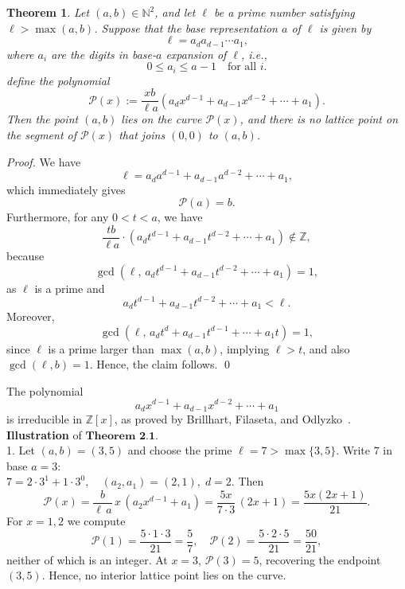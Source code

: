 \documentclass[12pt, reqno]{amsart}
\newtheorem{theorem}{Theorem}[section]
\theoremstyle{definition}
\theoremstyle{remark}
\numberwithin{equation}{section}
\begin{document}
\begin{theorem}
Let $(a,b) \in \mathbb{N}^{2}$, and let $\ell$ be a prime number satisfying $\ell > \max(a,b)$. Suppose that the base representation $a$ of $\ell$ is given by
\[
\ell = a_{d}a_{d-1}\cdots a_{1},
\]
where $a_{i}$ are the digits in base-$a$ expansion of $\ell$, i.e.,
\[
0 \leq a_{i} \leq a-1 \quad \text{for all } i.
\]
define the polynomial
\[
\mathcal{P}(x) := \frac{xb}{\ell a}\left(a_{d}x^{d-1} + a_{d-1}x^{d-2} + \cdots + a_{1}\right).
\]
Then the point $(a,b)$ lies on the curve $\mathcal{P}(x)$, and there is no lattice point on the segment of $\mathcal{P}(x)$ that joins $(0,0)$ to $(a,b)$.

\end{theorem}

\vspace{0.35cm}
\begin{proof}
We have
\[
\ell = a_{d}a^{d-1} + a_{d-1}a^{d-2} + \cdots + a_{1},
\]
which immediately gives
\[
\mathcal{P}(a) = b.
\]
Furthermore, for any $0 < t < a$, we have
\[
\frac{tb}{\ell a} \cdot (a_{d}t^{d-1} + a_{d-1}t^{d-2} + \cdots + a_{1}) \notin \mathbb{Z},
\]
because
\[
\gcd\left(\ell,\, a_{d}t^{d-1} + a_{d-1}t^{d-2} + \cdots + a_{1}\right) = 1,
\]
as $\ell$ is a prime and
\[
a_{d}t^{d-1} + a_{d-1}t^{d-2} + \cdots + a_{1} < \ell.
\]
Moreover,
\[
\gcd\left(\ell,\, a_{d}t^{d} + a_{d-1}t^{d-1} + \cdots + a_{1}t\right) = 1,
\]
since $\ell$ is a prime larger than $\max(a,b)$, implying $\ell > t$, and also $\gcd(\ell, b) = 1$.
Hence, the claim follows. \qed
\end{proof}

The polynomial
\[
a_{d}x^{d-1} + a_{d-1}x^{d-2} + \cdots + a_{1}
\]
is irreducible in $\mathbb{Z}[x]$, as proved by Brillhart, Filaseta, and Odlyzko~\cite{Filaseta}. 
\vspace{0.4cm} \\
\textbf{Illustration} of $\textbf{Theorem 2.1.}$\\
 


 1. Let $(a,b) = (3,5)$ and choose the prime $\ell = 7 > \max\{3,5\}$.  Write $7$ in base $a=3$:\\

  $7 = 2\cdot 3^1 + 1 \cdot 3^0,
  \quad (a_2,a_1) = (2,1), \; d = 2.$
Then
\[
  \mathcal P(x)
  = \frac{b}{\ell\,a}\,x\,(a_2 x^{d-1} + a_1)
  = \frac{5x}{7\cdot3}\,(2x+1)
  = \frac{5x(2x+1)}{21}.
\]
For $x=1,2$ we compute
\[
  \mathcal P(1) = \frac{5\cdot1\cdot3}{21} = \frac{5}{7}, 
  \quad
  \mathcal P(2) = \frac{5\cdot2\cdot5}{21} = \frac{50}{21},
\]
neither of which is an integer.  At $x=3$, $\mathcal P(3)=5$, recovering the endpoint $(3,5)$.  Hence, no interior lattice point lies on the curve.\\
\end{document}
